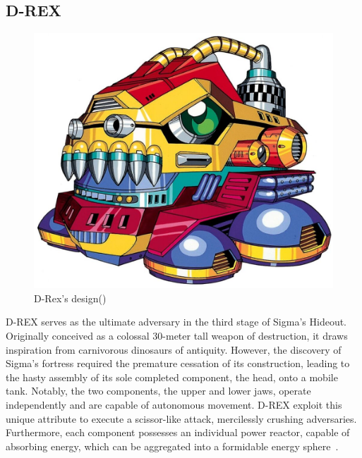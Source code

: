 \subsection{D-REX}\label{boss:D-Rex}
\begin{figure}[htp]
	\centering
	\includegraphics[height=\portraitsize]{figures/X1/Sigma_stages/Drex.jpg}
	\caption{D-Rex's design(\cite{book:MMX_Complete_art})}
\end{figure}
D-REX serves as the ultimate adversary in the third stage of Sigma's Hideout. Originally conceived as a colossal 30-meter tall weapon of destruction, it draws inspiration from carnivorous dinosaurs of antiquity. However, the discovery of Sigma's fortress required the premature cessation of its construction, leading to the hasty assembly of its sole completed component, the head, onto a mobile tank. Notably, the two components, the upper and lower jaws, operate independently and are capable of autonomous movement. D-REX exploit this unique attribute to execute a scissor-like attack, mercilessly crushing adversaries. Furthermore, each component possesses an individual power reactor, capable of absorbing energy, which can be aggregated into a formidable energy sphere~\cite{wayback:X_resources}.

